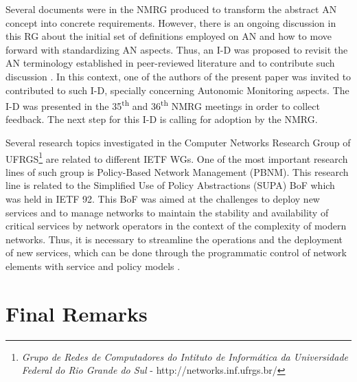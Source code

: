 \documentclass[12pt]{article}
\begin{document}

Several documents were in the NMRG produced to transform the abstract AN concept into concrete requirements. However, there is an ongoing discussion in this RG about the initial set of definitions employed on AN and how to move forward with standardizing AN aspects. Thus, an I-D was proposed to revisit the AN terminology established in peer-reviewed literature and to contribute such discussion \cite{NMRG-Pentikousis-2015}. In this context, one of the authors of the present paper was invited to contributed to such I-D, specially concerning Autonomic Monitoring aspects. The I-D was presented in the 35\textsuperscript{th} and 36\textsuperscript{th} NMRG meetings in order to collect feedback. The next step for this I-D is calling for adoption by the NMRG.


Several research topics investigated in the Computer Networks Research Group of UFRGS\footnote{\textit{Grupo de Redes de Computadores do Intituto de Informática da Universidade Federal do Rio Grande do Sul} - http://networks.inf.ufrgs.br/} are related to different IETF WGs. One of the most important research lines of such group is Policy-Based Network Management (PBNM). This research line is related to the Simplified Use of Policy Abstractions (SUPA) BoF which was held in IETF 92. This BoF was aimed at the challenges to deploy new services and to manage networks to maintain the stability and availability of critical services by network operators in the context of the complexity of modern networks. Thus, it is necessary to streamline the operations and the deployment of new services, which can be done through the programmatic control of network elements with service and policy models \cite{SUPA-Karagiannis-2015}. 


\section{Final Remarks}

\end{document}
